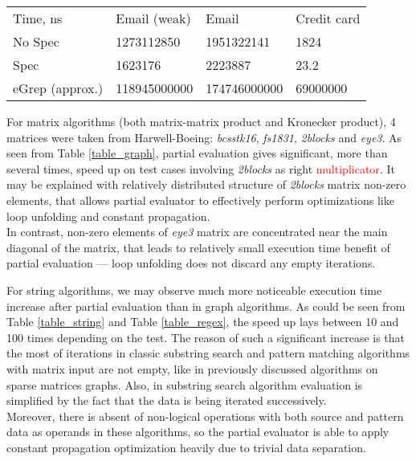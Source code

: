 \documentclass[conference]{IEEEtran}
\begin{document}
\begin{table*}[]
	\begin{tabular}{llll}
		Time, ns        & Email (weak) & Email        & Credit card \\
		No Spec         & 1273112850   & 1951322141   & 1824        \\
		Spec            & 1623176      & 2223887      & 23.2        \\
		eGrep (approx.) & 118945000000 & 174746000000 & 69000000          
	\end{tabular}
	\centering
	\caption{Execution time comparison of regular expression (automata) search non-specialized code (No spec),\\ specialized code in AnyDSL Impala (Spec) \\ and approximate time (the tool output is in integer ms) for code implemented with model tool (eGrep)}
	\label{table_regex}
\end{table*}

For matrix algorithms (both matrix-matrix product and Kronecker product), 4 matrices were taken from Harwell-Boeing: \textit{bcsstk16}, \textit{fs1831}, \textit{2blocks} and \textit{eye3}. As seen from Table \ref{table_graph}, partial evaluation gives significant, more than several times, speed up on test cases involving \textit{2blocks} as right \textcolor{red}{multiplicator}. It may be explained with relatively distributed structure of \textit{2blocks} matrix non-zero elements, that allows partial evaluator to effectively perform optimizations like loop unfolding and constant propagation.\\
In contrast, non-zero elements of \textit{eye3} matrix are concentrated near the main diagonal of the matrix, that leads to relatively small execution time benefit of partial evaluation --- loop unfolding does not discard any empty iterations.

For string algorithms, we may observe much more noticeable execution time increase after partial evaluation than in graph algorithms. As could be seen from Table \ref{table_string} and Table \ref{table_regex}, the speed up lays between 10 and 100 times depending on the test. The reason of such a significant increase is that the most of iterations in classic substring search and pattern matching algorithms \cite{cormen2009introduction} with matrix input are not empty, like in previously discussed algorithms on sparse matrices graphs. Also, in substring search algorithm evaluation is simplified by the fact that the data is being iterated successively.\\
Moreover, there is absent of non-logical operations with both source and pattern data as operands in these algorithms, so the partial evaluator is able to apply constant propagation optimization heavily due to trivial data separation.
\end{document}
